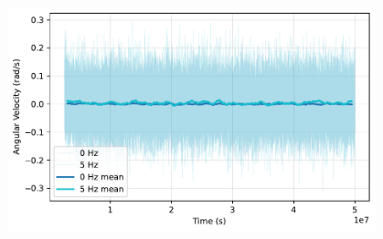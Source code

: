 \begin{figure}
  \begin{center}
    \includegraphics[width=0.95\textwidth]{figures/time_series.pdf}
  \end{center}
  \caption{}\label{fig:velocityvstime}
\end{figure}


